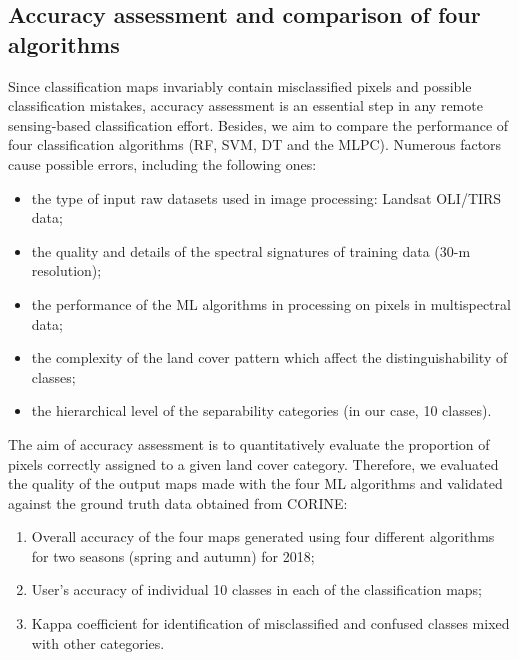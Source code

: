 \documentclass[remotesensing,article,submit,pdftex,moreauthors]{Definitions/mdpi}
\begin{document}
\subsection{Accuracy assessment and comparison of four algorithms}

Since classification maps invariably contain misclassified pixels and possible classification mistakes, accuracy assessment is an essential step in any remote sensing-based classification effort. Besides, we aim to compare the performance of four classification algorithms (RF, SVM, DT and {the} MLPC). Numerous factors cause possible errors, including the following ones:
\begin{itemize} 
	\item the type of input raw datasets used in image processing: Landsat OLI/TIRS data;
	\item the quality and details of the spectral signatures of training data (30-m resolution);
	\item the performance of the ML algorithms in processing on pixels in multispectral data;
	\item the complexity of the land cover pattern which affect the distinguishability of classes;
	\item the hierarchical level of the separability categories (in our case, 10 classes).
\end{itemize} 
	
The aim of accuracy assessment is to  {quantitatively evaluate the proportion of pixels correctly assigned to a given land cover category}. Therefore, we evaluated the quality of the {output maps made with the four ML algorithms and validated against the ground truth data obtained from CORINE}:
\begin{enumerate}
	\item Overall accuracy of the four maps generated using four different algorithms for two seasons (spring and autumn) {for 2018};
	\item User's accuracy of individual 10 classes in each of the classification maps;
	\item Kappa coefficient for identification of misclassified and confused classes mixed with other categories.
\end{enumerate}
\end{document}
